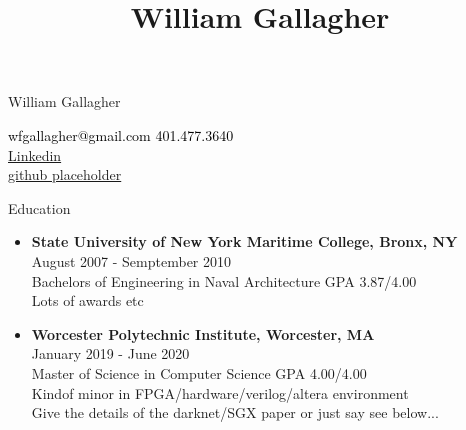 \documentclass[10pt,a4paper]{article}
\title{William Gallagher}
\begin{document}
{\selectfont

\begin{tcolorbox}
  \begin{minipage}{.5\textwidth}
    \huge{William Gallagher}
  \end{minipage}
  \begin{minipage}{.5\textwidth}
      \begin{center}
        \begin{flushright}
          {\textcolor{black}
            {
              {\selectfont
                wfgallagher@gmail.com  401.477.3640\\
                \href{https://www.linkedin.com/in/william-gallagher-705199170}{Linkedin} \\
                \href{https://www.github.com}{github placeholder} \\
              }
            }
          }
        \end{flushright}
      \end{center}
  \end{minipage}
\end{tcolorbox}

\begin{tcolorbox}
  {\selectfont
    \LARGE{Education}
  }
\end{tcolorbox}


\begin{tcolorbox}
  \begin{itemize}
  \item
    {
      \textbf{State University of New York Maritime College, Bronx, NY} \\
      August 2007 - Semptember 2010 \\
      Bachelors of Engineering in Naval Architecture GPA 3.87/4.00 \\
      Lots of awards etc
    }
  \item
    {
      \textbf{Worcester Polytechnic Institute, Worcester, MA} \\
      January 2019 - June 2020 \\
      Master of Science in Computer Science GPA 4.00/4.00 \\
      Kindof minor in FPGA/hardware/verilog/altera environment \\
      Give the details of the darknet/SGX paper or just say see below...
    }
  \end{itemize}
\end{tcolorbox}

}
\end{document}
